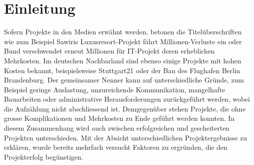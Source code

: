 \chapter{Einleitung}
Sofern Projekte in den Medien erwähnt werden, betonen die Titelüberschriften wie zum Beispiel \glqq Sawiris Luxusresort-Projekt fährt Millionen-Verluste ein\grqq{ }\cite{nzz16} oder \glqq Bund verschwendet erneut Millionen für IT-Projekt\grqq{ }\cite{fuchs15} deren  erheblichen Mehrkosten. Im deutschen Nachbarland sind ebenso einige Projekte mit hohen Kosten bekannt, beispielsweise Stuttgart21 oder der Bau des Flughafen Berlin Brandenburg. Der gemeinsamer Nenner kann auf unterschiedliche Gründe, zum Beispiel geringe Auslastung, unzureichende Kommunikation, mangelhafte Bauarbeiten oder administrative Herausforderungen zurückgeführt werden, wobei die Aufzählung nicht abschliessend ist. Demgegenüber stehen Projekte, die ohne grosse Komplikationen und Mehrkosten zu Ende geführt werden konnten. In diesem Zusammenhang wird auch zwischen erfolgreichen und gescheiterten Projekten unterschieden. Mit der Absicht unterschiedlichen Projektergebnisse zu erklären, wurde bereits mehrfach versucht Faktoren zu ergründen, die den Projekterfolg begünstigen.
\newline\newline
